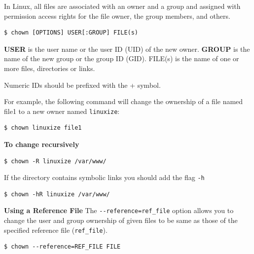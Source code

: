 \documentclass{article}
\newenvironment{blocktemplate}[1]{%
    \tcolorbox[beamer,%
    noparskip,breakable,
    colframe=Blue,%
    colbacklower=LimeGreen!75!LightGreen,%
    title=#1]}%
    {\endtcolorbox}
\newenvironment{blocktemplateII}[1]{%
    \tcolorbox[beamer,%
    noparskip,breakable,
    colframe=Green,%
    colbacklower=LimeGreen!75!LightGreen,%
    title=#1]}%
    {\endtcolorbox}
\newenvironment{codetemplate}[1][]{%
  \mybasecolorbox[#1]
  \itshape
}{%
  \endmybasecolorbox
}
\begin{document}
In Linux, all files are associated with an owner and a group and assigned with permission access rights for the file owner, the group members, and others.

\begin{codetemplate}{}
\begin{verbatim}
$ chown [OPTIONS] USER[:GROUP] FILE(s)
\end{verbatim}
\end{codetemplate}

\textbf{USER} is the user name or the user ID (UID) of the new owner. \textbf{GROUP} is the name of the new group or the group ID (GID). FILE(s) is the name of one or more files, directories or links.

\begin{blocktemplate}{NOTE}
Numeric IDs should be prefixed with the + symbol.
\end{blocktemplate}

For example, the following command will change the ownership of a file named file1 to a new owner named \verb|linuxize|:
\begin{codetemplate}{}
\begin{verbatim}
$ chown linuxize file1
\end{verbatim}
\end{codetemplate}

\textbf{To change recursively}
\begin{codetemplate}{}
\begin{verbatim}
$ chown -R linuxize /var/www/
\end{verbatim}
\end{codetemplate}

\begin{blocktemplateII}{NOTE}
If the directory contains symbolic links you should add the flag \verb|-h|
\begin{codetemplate}{}
\begin{verbatim}
$ chown -hR linuxize /var/www/
\end{verbatim}
\end{codetemplate}
\end{blocktemplateII}

\textbf{Using a Reference File}
The \verb|--reference=ref_file| option allows you to change the user and group ownership of given files to be same as those of the specified reference file (\verb|ref_file|). 
\begin{codetemplate}{}
\begin{verbatim}
$ chown --reference=REF_FILE FILE
\end{verbatim}
\end{codetemplate}
\end{document}
